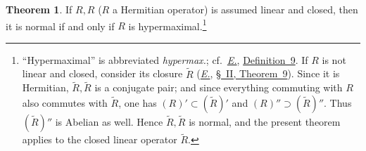 \documentclass[
  paper=b5,
  twoside=true,
  fontsize=13pt,
  headings=normal,
  bookmarkpackage=false
]{scrartcl}
\theoremstyle{definition}
\newtheorem{theorem}{Theorem}
\newcommand{\Eref}{\hyperref[fn:E-paper]{\emph{E.}}}
\newcommand{\ErefText}[1]{\href{https://doi.org/10.1007/BF01782338}{#1}}
\begin{document}
\begin{theorem}\label{thm:12}
If \(R,R\) (\(R\) a Hermitian operator) is assumed linear and closed,
then it is normal if and only if \(R\) is hypermaximal.\footnote{\label{fn:62}
``Hypermaximal'' is abbreviated \emph{hypermax.}; cf.\ \Eref, \ErefText{Definition~9}.  If \(R\) is not linear and closed, consider its closure
\(\widetilde R\) (\Eref, \ErefText{\S~II, Theorem~9}).  Since it is Hermitian,
\(\widetilde R,\widetilde R\) is a conjugate pair; and since everything
commuting with \(R\) also commutes with \(\widetilde R\), one has
\((R)'\subset(\widetilde R)'\) and
\((R)''\supset(\widetilde R)''\).  Thus \((\widetilde R)''\) is Abelian
as well.  Hence \(\widetilde R,\widetilde R\) is normal, and the present
theorem applies to the closed linear operator \(\widetilde R\).}
\end{theorem}
\end{document}
